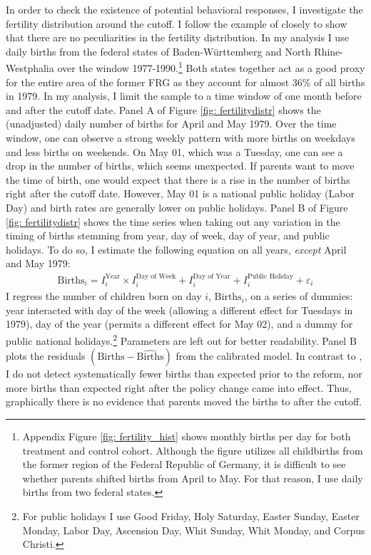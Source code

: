 \documentclass[11pt, a4paper,draft]{article} %
\begin{document}
In order to check the existence of potential behavioral responses, I investigate the fertility distribution around the cutoff. I follow the example of \cite{gans2009born} closely to show that there are no peculiarities in the fertility distribution. In my analysis I use daily births from the federal states of Baden-Württemberg and North Rhine-Westphalia over the window 1977-1990.\footnote{Appendix Figure \ref{fig: fertility_hist} shows monthly births per day for both treatment and control cohort. Although the figure utilizes all childbirths from the former region of the Federal Republic of Germany, it is difficult to see whether parents shifted births from April to May. For that reason, I use daily births from two federal states.} Both states together act as a good proxy for the entire area of the former FRG as they account for almost 36\% of all births in 1979. In my analysis, I limit the sample to a time window of one month before and after the cutoff date. Panel A of Figure \ref{fig: fertilitydistr} shows the (unadjusted) daily number of births for April and May 1979. Over the time window, one can observe a strong weekly pattern with more births on weekdays and less births on weekends. On May 01, which was a Tuesday, one can see a drop in the number of births, which seems unexpected. If parents want to move the time of birth, one would expect that there is a rise in the number of births right after the cutoff date. However, May 01 is a national public holiday (Labor Day) and birth rates are generally lower on public holidays. \newline 
Panel B of Figure \ref{fig: fertilitydistr} shows the time series when taking out any variation in the timing of births stemming from year, day of week, day of year, and public holidays. To do so, I estimate the following equation on all years, \emph{except} April and May 1979:
\begin{align}
\text{Births}_i = I^{\text{Year}}_i\times I^{\text{Day of Week}}_i + I^{\text{Day of Year}}_i + I^{\text{Public Holiday}}_i + \varepsilon_i \label{eq: validity_fig}
\end{align}
I regress the number of children born on day $i$, $\text{Births}_i$, on a series of dummies: year interacted with day of the week (allowing a different effect for Tuesdays in 1979), day of the year (permits a different effect for May 02), and a dummy for public national holidays.\footnote{For public holidays I use Good Friday, Holy Saturday, Easter Sunday, Easter Monday, Labor Day, Ascension Day, Whit Sunday, Whit Monday, and Corpus Christi.} Parameters are left out for better readability. Panel B plots the residuals $(\text{Births}-\widehat{\text{Births}})$ from the calibrated model. In contrast to \cite{gans2009born}, I do not detect systematically fewer births than expected prior to the reform, nor more births than expected right after the policy change came into effect. Thus, graphically there is no evidence that parents moved the births to after the cutoff. \newline 
\end{document}
